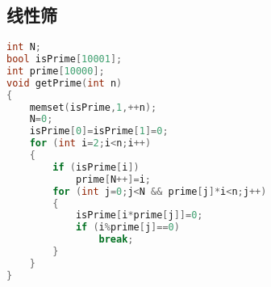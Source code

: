 \subsection{线性筛}
	\begin{lstlisting}[language=c++]
int N;
bool isPrime[10001];
int prime[10000];
void getPrime(int n)
{
	memset(isPrime,1,++n);
	N=0;
	isPrime[0]=isPrime[1]=0;
	for (int i=2;i<n;i++)
	{
		if (isPrime[i])
			prime[N++]=i;
		for (int j=0;j<N && prime[j]*i<n;j++)
		{
			isPrime[i*prime[j]]=0;
			if (i%prime[j]==0)
				break;
		}
	}
}
	\end{lstlisting}